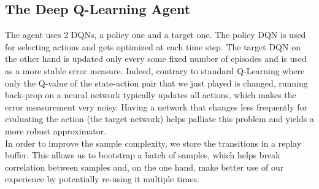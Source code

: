 \documentclass[11pt]{article}
\begin{document}
\subsection{The Deep Q-Learning Agent}
The agent uses 2 DQNs, a policy one and a target one. The policy DQN is used for selecting actions and gets optimized at each time step. The target DQN on the other hand is updated only every some fixed number of episodes and is used as a more stable error measure. Indeed, contrary to standard Q-Learning where only the Q-value of the state-action pair that we just played is changed, running back-prop on a neural network typically updates all actions, which makes the error measurement very noisy. Having a network that changes less frequently for evaluating the action (the target network) helps palliate this problem and yields a more robust approximator.\\
In order to improve the sample complexity, we store the transitions in a replay buffer. This allows us to bootstrap a batch of samples, which helps break correlation between samples and, on the one hand, make better use of our experience by potentially re-using it multiple times.\\
\end{document}

